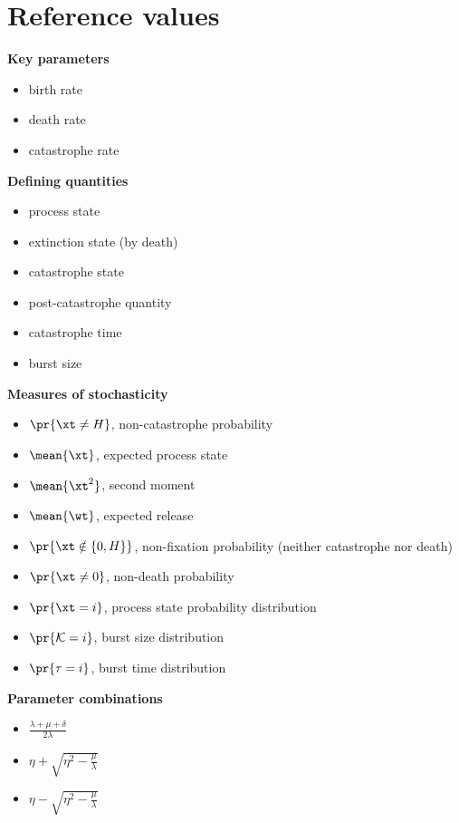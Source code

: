 \section{Reference values}




\newcommand\indentA{3cm}

\noindent
\textbf{Key parameters}
\begin{itemize}[leftmargin=\indentA]
\item[$\lambda$ :]birth rate 
\item[$\mu$: ]death rate
\item[$\delta$ :]catastrophe rate
\end{itemize}

\noindent
\textbf{Defining quantities}
\begin{itemize}[leftmargin=\indentA]
\item[$\xt$ :]process state
\item[$\xt=0$ :]extinction state (by death)
\item[$\xt=H$ :]catastrophe state
\item[$\wt$ :]post-catastrophe quantity
\item[$\tau$ :] catastrophe time
\item[$\mathcal{K}$ :]burst size
\end{itemize}

\noindent
\textbf{Measures of stochasticity}
\begin{itemize}[leftmargin=\indentA]
\item[$I(t)$ :]$\pr{\xt\neq H}$, non-catastrophe probability
\item[$J(t)$ :]$\mean{\xt}$, expected process state 
\item[$K(t)$ :]$\mean{\xt^2}$, second moment
\item[$V(t)$ :]$\mean{\wt}$, expected release
\item[$I_{\text{fix}}(t)$ :]$\pr{\xt\notin \{0,H\}}$, non-fixation probability (neither catastrophe nor death)
\item[$I_{\text{death}}$ :]$\pr{\xt\neq0}$, non-death probability
\item[$p_k(t)$ :]$\pr{\xt = i}$, process state probability distribution
\item[$P_k$ :]$\pr{\mathcal{K} = i}$, burst size distribution 
\item[$\phi_k$ :]$\pr{\tau = i}$, burst time distribution 
\end{itemize}

\noindent
\textbf{Parameter combinations}
\begin{itemize}[leftmargin=\indentA]
\item[$\eta$ =]$\frac{\lambda+\mu+\delta}{2\lambda}$
\item[$a$ =]$\eta+\sqrt{\eta^2-\frac{\mu}{\lambda}}$
\item[$b$ =]$\eta-\sqrt{\eta^2-\frac{\mu}{\lambda}}$
\end{itemize}


